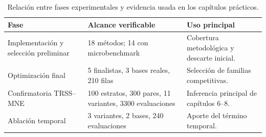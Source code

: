 \begin{table}[htbp]
\centering
\small
\caption{Relación entre fases experimentales y evidencia usada en los capítulos prácticos.}
\label{tab:ch6_phase_map}
\begin{tabular}{@{}p{2.8cm}p{4.2cm}p{4.4cm}@{}}
\toprule
Fase & Alcance verificable & Uso principal \\
\midrule
Implementación y selección preliminar & 18 métodos; 14 con microbenchmark & Cobertura metodológica y descarte inicial. \\
Optimización final & 5 finalistas, 3 bases reales, 210 filas & Selección de familias competitivas. \\
Confirmatoria TRSS--MNE & 100 estratos, 300 pares, 11 variantes, 3300 evaluaciones & Inferencia principal de capítulos 6--8. \\
Ablación temporal & 3 variantes, 2 bases, 240 evaluaciones & Aporte del término temporal. \\
\bottomrule
\end{tabular}
\end{table}
